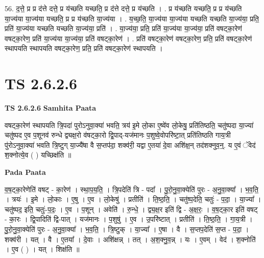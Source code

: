 \documentclass[17pt]{extarticle}
\begin{document}
56. द॒त्ते॒ प्र प्र द॑त्ते दत्ते॒ प्र य॑च्छति यच्छति॒ प्र द॑त्ते दत्ते॒ प्र य॑च्छति । . प्र य॑च्छति यच्छति॒ प्र प्र य॑च्छति या॒ज्य॑या या॒ज्य॑या यच्छति॒ प्र प्र य॑च्छति या॒ज्य॑या । . य॒च्छ॒ति॒ या॒ज्य॑या या॒ज्य॑या यच्छति यच्छति या॒ज्य॑या॒ प्रति॒ प्रति॑ या॒ज्य॑या यच्छति यच्छति या॒ज्य॑या॒ प्रति॑ । . या॒ज्य॑या॒ प्रति॒ प्रति॑ या॒ज्य॑या या॒ज्य॑या॒ प्रति॑ वषट्का॒रेण॑ वषट्का॒रेण॒ प्रति॑ या॒ज्य॑या या॒ज्य॑या॒ प्रति॑ वषट्का॒रेण॑ । . प्रति॑ वषट्का॒रेण॑ वषट्का॒रेण॒ प्रति॒ प्रति॑ वषट्का॒रेण॑ स्थापयति स्थापयति वषट्का॒रेण॒ प्रति॒ प्रति॑ वषट्का॒रेण॑ स्थापयति । \newline
\pagebreak
{}
\section*{ TS 2.6.2.6 }

\textbf{TS 2.6.2.6 } \newline
\textbf{Samhita Paata} \newline

वषट्का॒रेण॑ स्थापयति त्रि॒पदा॑ पुरोऽनुवा॒क्या॑ भवति॒ त्रय॑ इ॒मे लो॒का ए॒ष्वे॑व लो॒केषु॒ प्रति॑तिष्ठति॒ चतु॑ष्पदा या॒ज्या॑ चतु॑ष्पद ए॒व प॒शूनव॑ रुन्धे द्व्यक्ष॒रो व॑षट्का॒रो द्वि॒पाद्-यज॑मानः प॒शुष्वे॒वोपरि॑ष्टा॒त् प्रति॑तिष्ठति गाय॒त्री पु॑रोऽनुवा॒क्या॑ भवति त्रि॒ष्टुग् या॒ज्यै॑षा वै स॒प्तप॑दा॒ शक्व॑री॒ यद्वा ए॒तया॑ दे॒वा अशि॑क्ष॒न् तद॑शक्नुव॒न्॒. य ए॒वं ॅवेद॑ श॒क्नोत्ये॒व ( ) यच्छिक्ष॑ति ॥ \newline

\textbf{Pada Paata} \newline

व॒ष॒ट्का॒रेणेति॑ वषट् - का॒रेण॑ । स्था॒प॒य॒ति॒ । त्रि॒पदेति॑ त्रि - पदा᳚ । पु॒रो॒नु॒वा॒क्येति॑ पुरः - अ॒नु॒वा॒क्या᳚ । भ॒व॒ति॒ । त्रयः॑ । इ॒मे । लो॒काः । ए॒षु । ए॒व । लो॒केषु॑ । प्रतीति॑ । ति॒ष्ठ॒ति॒ । चतु॑ष्प॒देति॒ चतुः॑ - प॒दा॒ । या॒ज्या᳚ । चतु॑ष्पद॒ इति॒ चतुः॑-प॒दः॒ । ए॒व । प॒शून् । अवेति॑ । रु॒न्धे॒ । द्व्य॒क्ष॒र इति॑ द्वि - अ॒क्ष॒रः॒ । व॒ष॒ट्का॒र इति॑ वषट् - का॒रः । द्वि॒पादिति॑ द्वि-पात् । यज॑मानः । प॒शुषु॑ । ए॒व । उ॒परि॑ष्टात् । प्रतीति॑ । ति॒ष्ठ॒ति॒ । गा॒य॒त्री । पु॒रो॒नु॒वा॒क्येति॑ पुरः - अ॒नु॒वा॒क्या᳚ । भ॒व॒ति॒ । त्रि॒ष्टुक् । या॒ज्या᳚ । ए॒षा । वै । स॒प्तप॒देति॑ स॒प्त - प॒दा॒ । शक्व॑री । यत् । वै । ए॒तया᳚ । दे॒वाः । अशि॑क्षन्न् । तत् । अ॒श॒क्नु॒व॒न्न् । यः । ए॒वम् । वेद॑ । श॒क्नोति॑ । ए॒व ( ) । यत् । शिक्ष॑ति ॥  \newline
\end{document}
